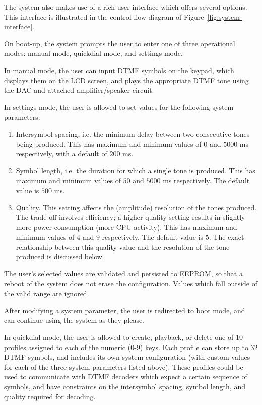 \documentclass[11pt,a4paper,twocolumn]{scrartcl}
\begin{document}
   The system also makes use of a rich user interface which offers several options. This interface is illustrated in the control flow diagram of Figure~\ref{fig:system-interface}.

   On boot-up, the system prompts the user to enter one of three operational modes: manual mode, quickdial mode, and settings mode.

   In manual mode, the user can input DTMF symbols on the keypad, which displays them on the LCD screen, and plays the appropriate DTMF tone using the DAC and attached amplifier/speaker circuit.

   In settings mode, the user is allowed to set values for the following system parameters:
   \begin{enumerate}
      \item Intersymbol spacing, i.e. the minimum delay between two consecutive tones being produced. This has maximum and minimum values of $0$ and $5000$ ms respectively, with a default of $200$ ms.
      \item Symbol length, i.e. the duration for which a single tone is produced. This has maximum and minimum values of $50$ and $5000$ ms respectively. The default value is $500$ ms.
      \item Quality. This setting affects the (amplitude) resolution of the tones produced. The trade-off involves efficiency; a higher quality setting results in slightly more power consumption (more CPU activity). This has maximum and minimum values of $4$ and $9$ respectively. The default value is $5$. The exact relationship between this quality value and the resolution of the tone produced is discussed below.
   \end{enumerate}

   The user's selected values are validated and persisted to EEPROM, so that a reboot of the system does not erase the configuration. Values which fall outside of the valid range are ignored.

   After modifying a system parameter, the user is redirected to boot mode, and can continue using the system as they please.

   In quickdial mode, the user is allowed to create, playback, or delete one of $10$ profiles assigned to each of the numeric ($0$-$9$) keys. Each profile can store up to $32$ DTMF symbols, and includes its own system configuration (with custom values for each of the three system parameters listed above). These profiles could be used to communicate with DTMF decoders which expect a certain sequence of symbols, and have constraints on the intersymbol spacing, symbol length, and quality required for decoding.
\end{document}
